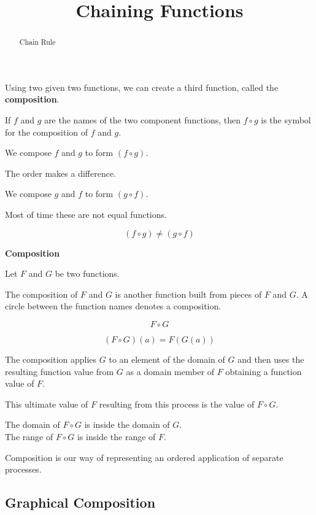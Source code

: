 \documentclass{ximera}
\title{Chaining Functions}
\begin{document}
\begin{abstract}
Chain Rule
\end{abstract}
\maketitle





Using two given two functions, we can create a third function, called the \textbf{composition}.

If $f$ and $g$ are the names of the two component functions, then $f \circ g$ is the symbol for the composition of $f$ and $g$.

We compose $f$ and $g$ to form $(f \circ g)$.

The order makes a difference.

We compose $g$ and $f$ to form $(g \circ f)$.


Most of time these are not equal functions.

\[
(f \circ g) \ne (g \circ f)
\]


\begin{idea} \textbf{\textcolor{blue!55!black}{Composition}}


Let $F$ and $G$ be two functions.

The composition of $F$ and $G$ is another function built from pieces of $F$ and $G$.  A circle between the function names denotes a composition.

\[
F \circ G
\]


\[
(F \circ G)(a) = F(G(a))
\]


The composition applies $G$ to an element of the domain of $G$ and then uses the resulting function value from $G$ as a domain member of $F$ obtaining a function value of $F$.

This ultimate value of $F$ resulting from this process is the value of $F \circ G$.

\end{idea}
The domain of $F \circ G$ is inside the domain of $G$.\\
The range of $F \circ G$ is inside the range of $F$.


Composition is our way of representing an ordered application of separate processes.



\subsection*{Graphical Composition}
\end{document}
